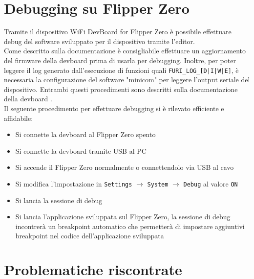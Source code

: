 \section{Debugging su Flipper Zero}
\label{sec:flip_dbg}

Tramite il dispositivo WiFi DevBoard for Flipper Zero è possibile effettuare debug del software sviluppato per il dispositivo tramite l'editor.\\
Come descritto sulla documentazione è consigliabile effettuare un aggiornamento del firmware della devboard prima di usarla per debugging. Inoltre, per poter leggere il log generato dall'esecuzione di funzioni quali \texttt{FURI\_LOG\_[D|I|W|E]}, è necessaria la configurazione del software "minicom" per leggere l'output seriale del dispositivo. Entrambi questi procedimenti sono descritti sulla documentazione della devboard \cite{devboard}.\\
Il seguente procedimento per effettuare debugging si è rilevato efficiente e affidabile:
\begin{itemize}
  \item Si connette la devboard al Flipper Zero spento
  \item Si connette la devboard tramite USB al PC
  \item Si accende il Flipper Zero normalmente o connettendolo via USB al cavo
  \item Si modifica l'impostazione in \texttt{Settings} \(\rightarrow\) \texttt{System} \(\rightarrow\) \texttt{Debug} al valore \texttt{ON}
  \item Si lancia la sessione di debug
  \item Si lancia l'applicazione sviluppata sul Flipper Zero, la sessione di debug incontrerà un breakpoint automatico che permetterà di impostare aggiuntivi breakpoint nel codice dell'applicazione sviluppata
\end{itemize}

\section{Problematiche riscontrate}
\label{sec:flip_probs}

